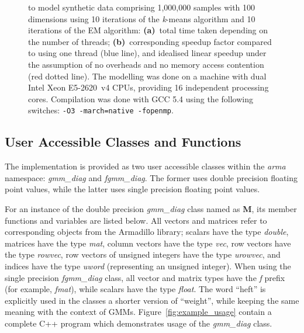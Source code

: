 \begin{figure}[!b]
{  to model synthetic data comprising 1,000,000 samples with 100 dimensions
  using 10 iterations of the {\it k}-means algorithm and 10 iterations of the EM algorithm:
  {\bf (a)}~total time taken depending on the number of threads;
  {\bf (b)}~corresponding speedup factor compared to using one thread (blue line), and idealised linear speedup under the assumption of no overheads and no memory access contention (red dotted line).
  The modelling was done on a machine with dual Intel Xeon E5-2620~v4 CPUs, providing 16 independent processing cores.
  Compilation was done with GCC 5.4 using the following switches: \texttt{-O3 -march=native -fopenmp}.
  }
\label{fig:speedup}
\end{figure}

\subsection{User Accessible Classes and Functions}

The implementation is provided as two user accessible classes within the {\it arma} namespace:
{\it gmm\_diag} and {\it fgmm\_diag}.
The former uses double precision floating point values, while the latter uses single precision floating point values.

For an instance of the double precision {\it gmm\_diag} class named as {\bf M},
its member functions and variables are listed below.
All vectors and matrices refer to corresponding objects from the Armadillo library;
scalars have the type {\it double},
matrices have the type {\it mat},
column vectors have the type {\it vec},
row vectors have the type {\it rowvec},
row vectors of unsigned integers have the type {\it urowvec},
and indices have the type {\it uword} (representing an unsigned integer).
When using the single precision {\it fgmm\_diag} class,
all vector and matrix types have the {\it f} prefix (for example, {\it fmat}),
while scalars have the type {\it float}.
The word ``heft'' is explicitly used in the classes a shorter version of ``weight'', while keeping the same meaning with the context of GMMs.
Figure~\ref{fig:example_usage} contain a complete C++ program which demonstrates usage of the {\it gmm\_diag} class.

